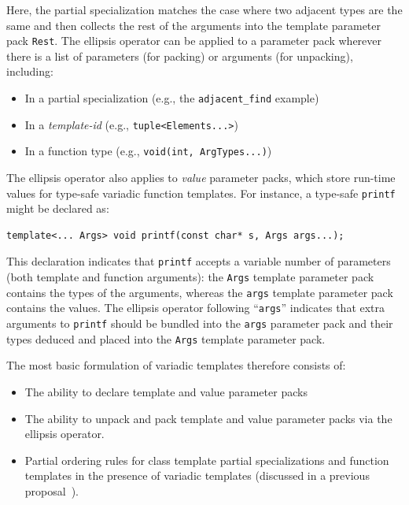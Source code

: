 \documentclass{article}
\begin{document}
Here, the partial specialization matches the case where two adjacent
types are the same and then collects the rest of the arguments into
the template parameter pack \texttt{Rest}. The ellipsis operator can
be applied to a parameter pack wherever there is a list of parameters
(for packing) or arguments (for unpacking), including:
\begin{itemize}
  \item In a partial specialization (e.g., the \texttt{adjacent\_find} example)
  \item In a \textit{template-id} (e.g., \texttt{tuple<Elements...>})
  \item In a function type (e.g., \texttt{void(int, ArgTypes...)})
\end{itemize}

The ellipsis operator also applies to \textit{value} parameter packs,
which store run-time values for type-safe variadic function
templates. For instance, a type-safe \texttt{printf} might be declared
as:

\begin{verbatim}
template<... Args> void printf(const char* s, Args args...);
\end{verbatim}

This declaration indicates that \texttt{printf} accepts a variable
number of parameters (both template and function arguments): the
\texttt{Args} template parameter pack contains the types of the
arguments, whereas the \texttt{args} template parameter pack contains
the values. The ellipsis operator following ``\texttt{args}''
indicates that extra arguments to \texttt{printf} should be bundled
into the \texttt{args} parameter pack and their types deduced and
placed into the \texttt{Args} template parameter pack.

The most basic formulation of variadic templates therefore consists
of:
\begin{itemize}
\item The ability to declare template and value parameter packs
\item The ability to unpack and pack template and value parameter
  packs via the ellipsis operator.
\item Partial ordering rules for class template partial
  specializations and function templates in the presence of variadic
  templates (discussed in a previous proposal~\cite{GJP04a}).
\end{itemize}
\end{document}
